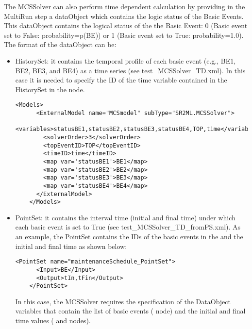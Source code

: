The MCSSolver can also perform time dependent calculation by providing in the MultiRun step a dataObject which
contains the logic status of the Basic Events.
This dataObject contains the logical status of the the Basic Event: 0 (Basic event set to False: probability=p(BE)) 
or 1 (Basic event set to True: probability=1.0).
The format of the dataObject can be:
\begin{itemize}
  \item HistorySet: it contains the temporal profile of each basic event (e.g., BE1, BE2, BE3, and BE4) as a time 
                    series (see test\_MCSSolver\_TD.xml). In this case it is needed to specify the ID of the time variable 
                    contained in the HistorySet in the  node.
  
   \begin{lstlisting}[style=XML,morekeywords={anAttribute},caption=Time dependent (from HistorySet) MCSSolver model input example., label=lst:MCSSolver_InputExample]
     <Models>
      <ExternalModel name="MCSmodel" subType="SR2ML.MCSSolver">
        <variables>statusBE1,statusBE2,statusBE3,statusBE4,TOP,time</variables>
        <solverOrder>3</solverOrder>
        <topEventID>TOP</topEventID>
        <timeID>time</timeID>
        <map var='statusBE1'>BE1</map>
        <map var='statusBE2'>BE2</map>
        <map var='statusBE3'>BE3</map>
        <map var='statusBE4'>BE4</map>
      </ExternalModel>
    </Models>
  \end{lstlisting}
  
  \item PointSet: it contains the interval time (initial and final time) under which each basic event is set to 
                  True (see test\_MCSSolver\_TD\_fromPS.xml). As an example, the PointSet contains the IDs of the basic events
                  in the and the initial and final time as shown below:
                  
   \begin{lstlisting}[style=XML,morekeywords={anAttribute},caption= Example of PointSet for time dependent MCSSolver calculation., label=lst:MCSSolver_InputExample]
    <PointSet name="maintenanceSchedule_PointSet">
      <Input>BE</Input>
      <Output>tIn,tFin</Output>
    </PointSet>
    \end{lstlisting}
    
                  In this case, the MCSSolver requires the specification of the DataObject variables that contain the list of basic events
                  ( node) and the initial and final time values ( and  nodes).
                  

\end{itemize}
